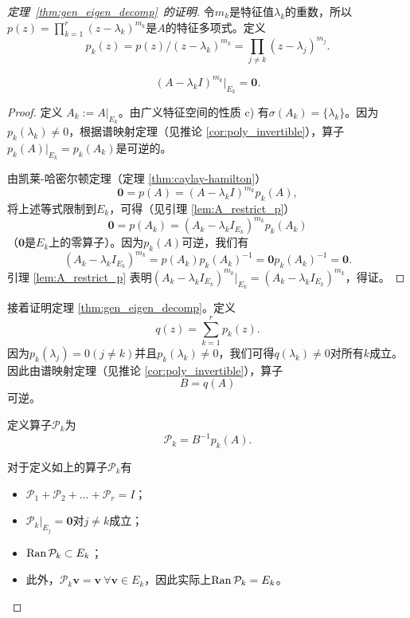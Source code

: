 \begin{proof}[定理~\ref{thm:gen_eigen_decomp}~的证明]
    令$m_k$是特征值$\lambda_k$的重数，所以$p(z)=\prod_{k=1}^{r}(z-\lambda_{k})^{m_{k}}$是$A$的特征多项式。定义\[p_k(z)=p(z)/(z-\lambda_k)^{m_k}=\prod_{j\neq k}(z-\lambda_j)^{m_j}.\]

\begin{lemma}
    \begin{equation}\label{power_zero}
        (A-\lambda_k I)^{m_k}|_{E_k} = \mathbf{0}.
    \end{equation}
\end{lemma}

\begin{proof}
    定义 $A_k:=A|_{E_k}$。由广义特征空间的性质 c) 有$\sigma(A_k) = \{\lambda_k\}$。因为$p_k(\lambda_k)\ne 0$，根据谱映射定理（见推论 \ref{cor:poly_invertible}），算子$p_k(A)|_{E_k}=p_k(A_k)$是可逆的。
    
    由凯莱-哈密尔顿定理（定理 \ref{thm:caylay-hamilton}）\[\mathbf{0}=p(A)=(A-\lambda_k I)^{m_k}p_k(A),\]
    将上述等式限制到$E_k$，可得（见引理 \ref{lem:A_restrict_p}）\[\mathbf{0}=p(A_k)=(A_k-\lambda_k I_{E_k})^{m_k}p_k(A_k)\]
    （$\mathbf{0}$是$E_k$上的零算子）。因为$p_k(A)$可逆，我们有\[(A_k-\lambda_k I_{E_k})^{m_k}=p(A_k)p_k(A_k)^{-1}=\mathbf{0}p_k(A_k)^{-1}=\mathbf{0}.\]
    引理 \ref{lem:A_restrict_p} 表明$(A_k-\lambda_k I_{E_k})^{m_k}|_{E_k} = (A_k-\lambda_k I_{E_k})^{m_k}$，得证。
\end{proof}

接着证明定理 \ref{thm:gen_eigen_decomp}。定义\[q(z)=\sum_{k=1}^rp_k(z).\]
因为$p_k(\lambda_j)=0(j\ne k)$并且$p_k(\lambda_k)\ne 0$，我们可得$q(\lambda_k)\ne 0$对所有$k$成立。因此由谱映射定理（见推论 \ref{cor:poly_invertible}），算子
\[B=q(A)\]可逆。




定义算子$\mathcal{P}_k$为\[\mathcal{P}_k=B^{-1}p_k(A).\]

\begin{lemma}\label{lem:prop_of_pk}
    对于定义如上的算子$\mathcal{P}_k$有
    \begin{itemize}
        \item [a)] $\mathcal{P}_1+\mathcal{P}_2+\ldots+\mathcal{P}_r=I$；
        \item [b)] $\mathcal{P}_k|_{E_j}=\mathbf{0}$对$j\ne k$成立；
        \item [c)] $\operatorname{Ran} \mathcal{P}_k\subset E_k$；
        \item [d)] 此外，$\mathcal{P}_k\mathbf{v}=\mathbf{v} \ \forall\mathbf{v}\in E_k$，因此实际上$\operatorname{Ran} \mathcal{P}_k= E_k$。
    \end{itemize}
\end{lemma}


\end{proof}
